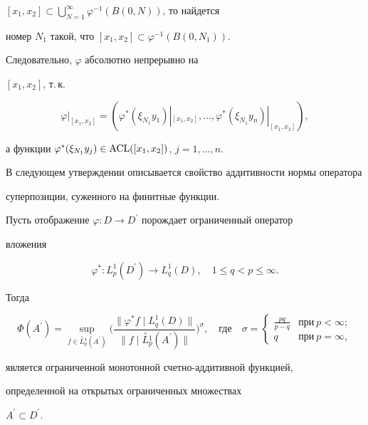 \begin{pf}
$[x_1,x_2]\subset


\bigcup\limits_{N=1}^\infty\varphi^{-1}(B(0,N))$, то найдется


номер $N_1$ такой, что $[x_1,x_2]\subset\varphi^{-1}(B(0,N_1))$.


Следовательно, $\varphi$ абсолютно непрерывно на


$[x_1,x_2]$, т.\,к.


$$


\varphi|_{[x_1,x_2]}=(\varphi^{\ast}(\xi_{N_1}


y_1)|_{[x_1,x_2]}, \ldots, \varphi^{\ast}(\xi_{N_1}


y_n)|_{[x_1,x_2]}),


$$


а функции $\varphi^{\ast}(\xi_{N_1}


y_j)\in\ACL([x_1,x_2])$, $j=1,\dotsc,n$.


\end{pf}





В следующем утверждении описывается свойство аддитивности нормы оператора


суперпозиции, суженного на финитные функции.





\begin{lem}


Пусть отображение $\varphi :


D\to D^{\prime}$ порождает ограниченный оператор


вложения


$$


\varphi^{\ast} : L^1_p(D^{\prime})\to


L^1_q(D),\quad 1\leq q<p\leq\infty.


$$


Тогда


$$


\Phi(A^{\prime})=\sup_{f\in


\overset{\circ}{L}{}_{p}^{1}(A^{\prime})} \bigg(


\frac{\|\varphi^{\ast} f\mid {L}_{q}^{1}(D)\|}


{\|f\mid\overset{\circ}{L}{}_{p}^{1}(A^{\prime})\|}


\bigg)^{\sigma},\quad \text{где}\quad


\sigma=


\begin{cases}


\frac{pq}{p-q} & \text{при}\ p<\infty;\\


q\ & \text{при}\ p=\infty,


\end{cases}


$$


является ограниченной монотонной счетно-аддитивной функцией,


определенной на открытых ограниченных множествах


$A^{\prime}\subset D^{\prime}$.


\end{lem}





